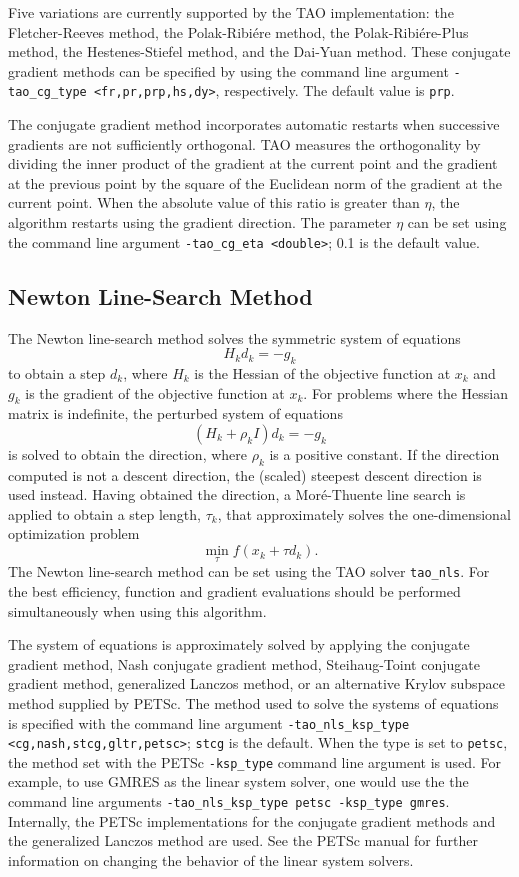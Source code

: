 Five variations are currently supported by the TAO implementation: the 
Fletcher-Reeves method, the Polak-Ribi\'ere method, the Polak-Ribi\'ere-Plus 
method\cite{NW99}, the Hestenes-Stiefel method, and the Dai-Yuan method.  
These conjugate gradient methods can be specified by using the command line 
argument {\tt -tao\_cg\_type <fr,pr,prp,hs,dy>}, respectively.  The default 
value is {\tt prp}.  

The conjugate gradient method incorporates automatic restarts when successive 
gradients are not sufficiently orthogonal.  TAO measures the orthogonality by 
dividing the inner product of the gradient at the current point and the 
gradient at the previous point by the square of the Euclidean norm of 
the gradient at the current point.  When the absolute value of this 
ratio is greater than $\eta$, the algorithm restarts using the gradient 
direction.  The parameter $\eta$ can be set using the command line argument 
{\tt -tao\_cg\_eta <double>}; 0.1 is the default value.  

\subsection{Newton Line-Search Method}

The Newton line-search method solves the symmetric system of equations
\[
H_k d_k = -g_k
\]
to obtain a step $d_k$, where $H_k$ is the Hessian of the objective function
at $x_k$ and $g_k$ is the gradient of the objective function at $x_k$.
For problems where the Hessian matrix is indefinite, the perturbed system
of equations
\[
(H_k + \rho_k I) d_k = -g_k
\]
is solved to obtain the direction, where $\rho_k$ is a positive constant.
If the direction computed is not a descent direction, the (scaled) steepest 
descent direction is used instead.  Having obtained the direction, 
a Mor\'{e}-Thuente line search is applied to obtain a step length, 
$\tau_k$, that approximately solves the one-dimensional optimization 
problem
\[
\min_\tau f(x_k + \tau d_k).
\]
The Newton line-search method can be set using the TAO solver {\tt tao\_nls}.
For the best efficiency, function and gradient evaluations should be 
performed simultaneously when using this algorithm.

The system of equations is approximately solved by applying the conjugate 
gradient method, Nash conjugate gradient method, Steihaug-Toint conjugate 
gradient method, generalized 
Lanczos method, or an alternative Krylov subspace method 
supplied by PETSc.  The method used to solve the systems of equations is 
specified with the command line argument 
{\tt -tao\_nls\_ksp\_type <cg,nash,stcg,gltr,petsc>}; {\tt stcg} 
is the default.  When the type is set to {\tt petsc}, the method set with 
the PETSc {\tt -ksp\_type} command line argument is used.  For example, to 
use GMRES as the linear system solver, one would use the the command line 
arguments {\tt -tao\_nls\_ksp\_type petsc -ksp\_type gmres}.  Internally,
the PETSc implementations for the conjugate gradient methods and the 
generalized Lanczos method are used.  See the PETSc manual for further 
information on changing the behavior of the linear system solvers.  

